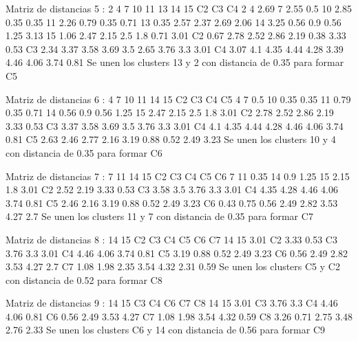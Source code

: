 \documentclass[a4paper, 12pt]{article}
\begin{document}
\begin{itemize}
\begin{Schunk}
\begin{Soutput}
Matriz de distancias 5 :
   2    4    7    10   11   13   14   15   C2   C3   C4
2                                                      
4  2.69                                                
7  2.55 0.5                                            
10 2.85 0.35 0.35                                      
11 2.26 0.79 0.35 0.71                                 
13 0.35 2.57 2.37 2.69 2.06                            
14 3.25 0.56 0.9  0.56 1.25 3.13                       
15 1.06 2.47 2.15 2.5  1.8  0.71 3.01                  
C2 0.67 2.78 2.52 2.86 2.19 0.38 3.33 0.53             
C3 2.34 3.37 3.58 3.69 3.5  2.65 3.76 3.3  3.01        
C4 3.07 4.1  4.35 4.44 4.28 3.39 4.46 4.06 3.74 0.81   
Se unen los clusters 13 y 2 con distancia de 0.35 para formar C5 

Matriz de distancias 6 :
   4    7    10   11   14   15   C2   C3   C4   C5
4                                                 
7  0.5                                            
10 0.35 0.35                                      
11 0.79 0.35 0.71                                 
14 0.56 0.9  0.56 1.25                            
15 2.47 2.15 2.5  1.8  3.01                       
C2 2.78 2.52 2.86 2.19 3.33 0.53                  
C3 3.37 3.58 3.69 3.5  3.76 3.3  3.01             
C4 4.1  4.35 4.44 4.28 4.46 4.06 3.74 0.81        
C5 2.63 2.46 2.77 2.16 3.19 0.88 0.52 2.49 3.23   
Se unen los clusters 10 y 4 con distancia de 0.35 para formar C6 

Matriz de distancias 7 :
   7    11   14   15   C2   C3   C4   C5  C6
7                                           
11 0.35                                     
14 0.9  1.25                                
15 2.15 1.8  3.01                           
C2 2.52 2.19 3.33 0.53                      
C3 3.58 3.5  3.76 3.3  3.01                 
C4 4.35 4.28 4.46 4.06 3.74 0.81            
C5 2.46 2.16 3.19 0.88 0.52 2.49 3.23       
C6 0.43 0.75 0.56 2.49 2.82 3.53 4.27 2.7   
Se unen los clusters 11 y 7 con distancia de 0.35 para formar C7 

Matriz de distancias 8 :
   14   15   C2   C3   C4   C5   C6   C7
14                                      
15 3.01                                 
C2 3.33 0.53                            
C3 3.76 3.3  3.01                       
C4 4.46 4.06 3.74 0.81                  
C5 3.19 0.88 0.52 2.49 3.23             
C6 0.56 2.49 2.82 3.53 4.27 2.7         
C7 1.08 1.98 2.35 3.54 4.32 2.31 0.59   
Se unen los clusters C5 y C2 con distancia de 0.52 para formar C8 

Matriz de distancias 9 :
   14   15   C3   C4   C6   C7   C8
14                                 
15 3.01                            
C3 3.76 3.3                        
C4 4.46 4.06 0.81                  
C6 0.56 2.49 3.53 4.27             
C7 1.08 1.98 3.54 4.32 0.59        
C8 3.26 0.71 2.75 3.48 2.76 2.33   
Se unen los clusters C6 y 14 con distancia de 0.56 para formar C9 


\end{Soutput}
\end{Schunk}
\end{itemize}
\end{document}
